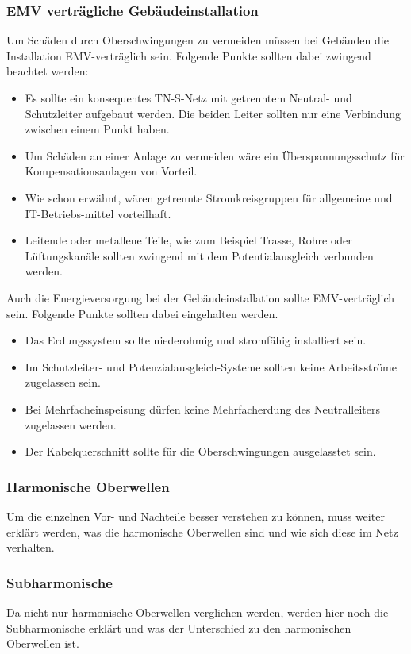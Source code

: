 \subsubsection{EMV verträgliche Gebäudeinstallation}

Um Schäden durch Oberschwingungen zu vermeiden müssen bei Gebäuden die Installation EMV-verträglich sein.
Folgende Punkte sollten dabei zwingend beachtet werden:

\begin{itemize}
	\item Es sollte ein konsequentes TN-S-Netz mit getrenntem Neutral- und Schutzleiter aufgebaut werden. Die beiden Leiter sollten nur eine Verbindung zwischen einem Punkt haben.
	\item Um Schäden an einer Anlage zu vermeiden wäre ein Überspannungsschutz für Kompensationsanlagen von Vorteil.
	\item Wie schon erwähnt, wären getrennte Stromkreisgruppen für allgemeine und IT-Betriebs-mittel vorteilhaft.
	\item Leitende oder metallene Teile, wie zum Beispiel Trasse, Rohre oder Lüftungskanäle sollten zwingend mit dem Potentialausgleich verbunden werden.
	
\end{itemize}

Auch die Energieversorgung bei der Gebäudeinstallation sollte EMV-verträglich sein. Folgende Punkte sollten dabei eingehalten werden. 

\begin{itemize}
	\item Das Erdungssystem sollte niederohmig und stromfähig installiert sein.
	\item Im Schutzleiter- und Potenzialausgleich-Systeme sollten keine Arbeitsströme zugelassen sein.
	\item Bei Mehrfacheinspeisung dürfen keine Mehrfacherdung des Neutralleiters zugelassen werden.
	\item Der Kabelquerschnitt sollte für die Oberschwingungen ausgelasstet sein.
\end{itemize}  


\subsubsection{Harmonische Oberwellen}
Um die einzelnen Vor- und Nachteile besser verstehen zu können, muss weiter erklärt werden, was die harmonische Oberwellen sind und wie sich diese im Netz verhalten.
\subsubsection{Subharmonische}
Da nicht nur harmonische Oberwellen verglichen werden, werden hier noch die Subharmonische erklärt und was der Unterschied zu den harmonischen Oberwellen ist. 
